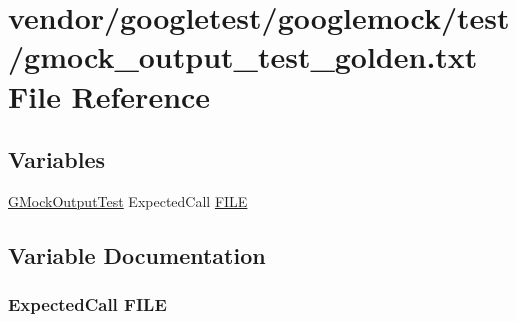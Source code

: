 \hypertarget{gmock__output__test__golden_8txt}{}\section{vendor/googletest/googlemock/test/gmock\+\_\+output\+\_\+test\+\_\+golden.txt File Reference}
\label{gmock__output__test__golden_8txt}
\subsection*{Variables}
\begin{DoxyCompactItemize}
\item 
\hyperlink{classGMockOutputTest}{G\+Mock\+Output\+Test} Expected\+Call \hyperlink{gmock__output__test__golden_8txt_ab12dc6c67167ae2f0af132bdd8c2955e}{F\+I\+LE}
\end{DoxyCompactItemize}


\subsection{Variable Documentation}
\subsubsection[{\texorpdfstring{F\+I\+LE}{FILE}}]{ Expected\+Call F\+I\+LE}\hypertarget{gmock__output__test__golden_8txt_ab12dc6c67167ae2f0af132bdd8c2955e}{}\label{gmock__output__test__golden_8txt_ab12dc6c67167ae2f0af132bdd8c2955e}
